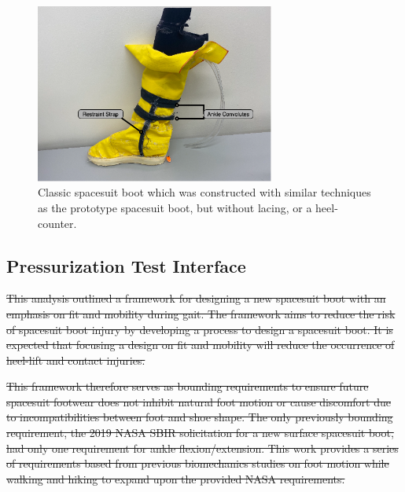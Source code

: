 \documentclass[defaultstyle,11pt]{thesis}
\providecommand{\DIFdeltex}[1]{{\protect\color{red}\sout{#1}}}                      %
\providecommand{\DIFaddbegin}{} %
\providecommand{\DIFaddend}{} %
\providecommand{\DIFdelbegin}{} %
\providecommand{\DIFdelend}{} %
\providecommand{\DIFdel}[1]{\texorpdfstring{\DIFdeltex{#1}}{}} %
\newcommand{\DIFscaledelfig}{0.5}
\newlength{\DIFdelgraphicswidth} %
\newlength{\DIFdelgraphicsheight} %
\newcommand{\DIFaddincludegraphics}[2][]{{\color{blue}\fbox{\DIFOincludegraphics[#1]{#2}}}} %
\newcommand{\DIFdelincludegraphics}[2][]{%
\sbox{\DIFdelgraphicsbox}{\DIFOincludegraphics[#1]{#2}}%
\settoboxwidth{\DIFdelgraphicswidth}{\DIFdelgraphicsbox} %
\settoboxtotalheight{\DIFdelgraphicsheight}{\DIFdelgraphicsbox} %
\scalebox{\DIFscaledelfig}{%
\parbox[b]{\DIFdelgraphicswidth}{\usebox{\DIFdelgraphicsbox}\\[-\baselineskip] \rule{\DIFdelgraphicswidth}{0em}}\llap{\resizebox{\DIFdelgraphicswidth}{\DIFdelgraphicsheight}{%
\setlength{\unitlength}{\DIFdelgraphicswidth}%
\begin{picture}(1,1)%
\thicklines\linethickness{2pt} %
{\color[rgb]{1,0,0}\put(0,0){\framebox(1,1){}}}%
{\color[rgb]{1,0,0}\put(0,0){\line( 1,1){1}}}%
{\color[rgb]{1,0,0}\put(0,1){\line(1,-1){1}}}%
\end{picture}%
}\hspace*{3pt}}} %
} %
\DeclareRobustCommand{\DIFaddbegin}{\DIFOaddbegin \let\includegraphics\DIFaddincludegraphics} %
\DeclareRobustCommand{\DIFaddend}{\DIFOaddend \let\includegraphics\DIFOincludegraphics} %
\DeclareRobustCommand{\DIFdelbegin}{\DIFOdelbegin \let\includegraphics\DIFdelincludegraphics} %
\DeclareRobustCommand{\DIFdelend}{\DIFOaddend \let\includegraphics\DIFOincludegraphics} %
\begin{document}
\begin{figure}
\hypertarget{fig:SA3-classic_boot}{%
\centering
\includegraphics[width=0.7\textwidth,height=\textheight]{../fig/SA3/Classic_Spaceboot.png}
\caption{Classic spacesuit boot which was constructed with similar techniques as the prototype spacesuit boot, but without lacing, or a heel-counter.}\label{fig:SA3-classic_boot}
}
\end{figure}

\DIFdelbegin %
\DIFdelend \DIFaddbegin \hypertarget{pressurization-test-interface}{%
\subsection{Pressurization Test Interface}\label{pressurization-test-interface}}
\DIFaddend 

\DIFdelbegin \DIFdel{This analysis outlined a framework for designing a new spacesuit boot with an emphasis on fit and mobility during gait.
The framework aims to reduce the risk of spacesuit boot injury by developing a process to design a spacesuit boot.
It is expected that focusing a design on fit and mobility will reduce the occurrence of heel-lift and contact injuries.
}%

\DIFdel{This framework therefore serves as bounding requirements to ensure future spacesuit footwear does not inhibit natural foot motion or cause discomfort due to incompatibilities between foot and shoe shape.
The only previously bounding requirement, the 2019 NASA SBIR solicitation for a new surface spacesuit boot, had only one requirement for ankle flexion/extension.
This work provides a series of requirements based from previous biomechanics studies on foot motion while walking and hiking to expand upon the provided NASA requirements.
}%
\end{document}
